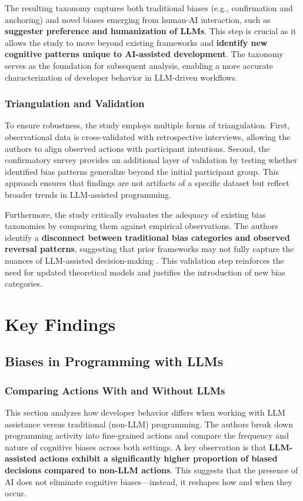The resulting taxonomy captures both traditional biases (e.g., confirmation and anchoring) and novel biases emerging from human-AI interaction, such as \textbf{suggester preference and humanization of LLMs}. This step is crucial as it allows the study to move beyond existing frameworks and \textbf{identify new cognitive patterns unique to AI-assisted development}. The taxonomy serves as the foundation for subsequent analysis, enabling a more accurate characterization of developer behavior in LLM-driven workflows.

\subsubsection{Triangulation and Validation}
To ensure robustness, the study employs multiple forms of triangulation. First, observational data is cross-validated with retrospective interviews, allowing the authors to align observed actions with participant intentions. Second, the confirmatory survey provides an additional layer of validation by testing whether identified bias patterns generalize beyond the initial participant group. This approach ensures that findings are not artifacts of a specific dataset but reflect broader trends in LLM-assisted programming.

Furthermore, the study critically evaluates the adequacy of existing bias taxonomies by comparing them against empirical observations. The authors identify a \textbf{disconnect between traditional bias categories and observed reversal patterns}, suggesting that prior frameworks may not fully capture the nuances of LLM-assisted decision-making . This validation step reinforces the need for updated theoretical models and justifies the introduction of new bias categories.

\section{Key Findings}
\subsection{Biases in Programming with LLMs}
\subsubsection{Comparing Actions With and Without LLMs}
This section analyzes how developer behavior differs when working with LLM assistance versus traditional (non-LLM) programming. The authors break down programming activity into fine-grained actions and compare the frequency and nature of cognitive biases across both settings. A key observation is that \textbf{LLM-assisted actions exhibit a significantly higher proportion of biased decisions compared to non-LLM actions}. This suggests that the presence of AI does not eliminate cognitive biases—instead, it reshapes how and when they occur.

